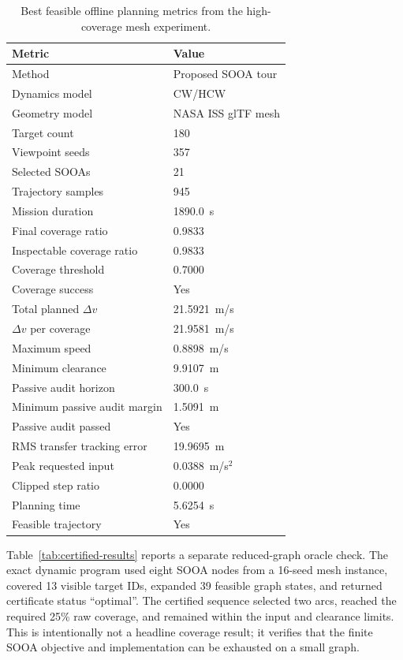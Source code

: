 \begin{table}[t]
  \centering
  \caption{Best feasible offline planning metrics from the high-coverage mesh
  experiment.}
  \label{tab:offline-results}
  \begin{tabular}{ll}
    \toprule
    Metric & Value \\
    \midrule
    Method & Proposed SOOA tour \\
    Dynamics model & CW/HCW \\
    Geometry model & NASA ISS glTF mesh \\
    Target count & 180 \\
    Viewpoint seeds & 357 \\
    Selected SOOAs & 21 \\
    Trajectory samples & 945 \\
    Mission duration & 1890.0~s \\
    Final coverage ratio & 0.9833 \\
    Inspectable coverage ratio & 0.9833 \\
    Coverage threshold & 0.7000 \\
    Coverage success & Yes \\
    Total planned $\Delta v$ & 21.5921~m/s \\
    $\Delta v$ per coverage & 21.9581~m/s \\
    Maximum speed & 0.8898~m/s \\
    Minimum clearance & 9.9107~m \\
    Passive audit horizon & 300.0~s \\
    Minimum passive audit margin & 1.5091~m \\
    Passive audit passed & Yes \\
    RMS transfer tracking error & 19.9695~m \\
    Peak requested input & 0.0388~m/s$^2$ \\
    Clipped step ratio & 0.0000 \\
    Planning time & 5.6254~s \\
    Feasible trajectory & Yes \\
    \bottomrule
  \end{tabular}
\end{table}

Table~\ref{tab:certified-results} reports a separate reduced-graph oracle
check. The exact dynamic program used eight SOOA nodes from a 16-seed mesh
instance, covered 13 visible target IDs, expanded 39 feasible graph states,
and returned certificate status ``optimal''. The certified sequence selected
two arcs, reached the required 25\% raw coverage, and remained within the
input and clearance limits. This is intentionally not a headline coverage
result; it verifies that the finite SOOA objective and implementation can be
exhausted on a small graph.

